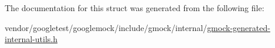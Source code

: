 The documentation for this struct was generated from the following file\+:\begin{DoxyCompactItemize}
\item 
vendor/googletest/googlemock/include/gmock/internal/\hyperlink{gmock-generated-internal-utils_8h}{gmock-\/generated-\/internal-\/utils.\+h}\end{DoxyCompactItemize}
